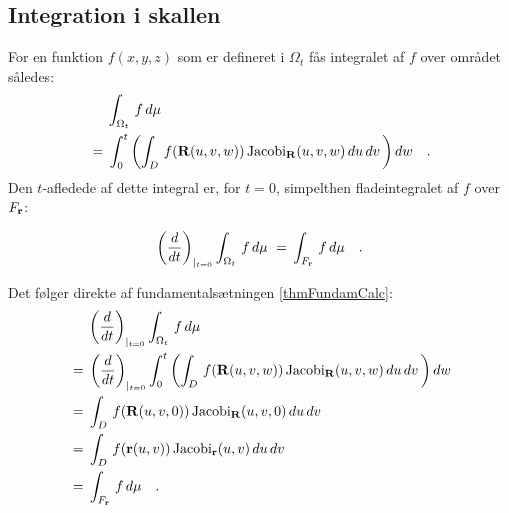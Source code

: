 \subsection{Integration i skallen} \label{secShellInt}
For en funktion $f(x,y,z)$ som er defineret i
$\Omega_{t}$ fås integralet af $f$ over området
således:
\begin{equation}
\begin{aligned}
&\phantom{= \,\,\,}\int_{\Omega_{t}}\, f\,d\mu \,
\\ &= \,\int_{0}^{t}\left(\int_{D}\,
f({\bf{R}}(u,v,w))
\operatorname{Jacobi}_{{\bf{R}}}(u,v,w)\,du\,dv\,\right)dw  \quad
.
\end{aligned}
\end{equation}
Den $t$-afledede af dette integral er, for $t =
0$, simpelthen fladeintegralet af $f$ over $F_{\bf{r}}$:
\begin{lemma} \label{lemFladeIntFraRumint}
\begin{equation} \label{eqShellDeriv}
\left(\frac{d}{dt}\right)_{|_{t=0}}\int_{\Omega_{t}}\,
f\,d\mu \, \, = \,
 \int_{F_{\bf{r}}}\,f \, d\mu \quad .
\end{equation}
\end{lemma}
\begin{bevis}
Det følger direkte af fundamentalsætningen
\ref{thmFundamCalc}:
\begin{equation}
\begin{aligned}
&\phantom{= \,\,\,}\left(\frac{d}{dt}\right)_{|_{t=0}}\int_{\Omega_{t}}\, f\,d\mu \, \\
&= \,
\left(\frac{d}{dt}\right)_{|_{t=0}}\int_{0}^{t}\left(\int_{D}\,
f({\bf{R}}(u,v,w))
\operatorname{Jacobi}_{{\bf{R}}}(u,v,w)\,du\,dv\,\right)dw \\ &=
\, \int_{D}\, f({\bf{R}}(u,v,0)) \operatorname{Jacobi}_{{\bf{R}}}(u,v,0)\,du\,dv \\
&= \, \int_{D} \,f({\bf{r}}(u,v))
\operatorname{Jacobi}_{{\bf{r}}}(u,v)\,du\,dv \\ &= \,
 \int_{F_{\bf{r}}}\,f \, d\mu \quad .
\end{aligned}
\end{equation}

\end{bevis}




